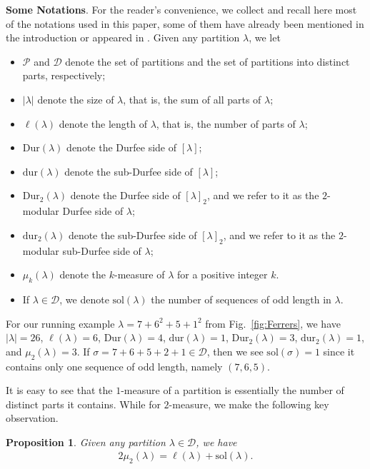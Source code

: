 \documentclass[11pt,reqno]{amsart}
\numberwithin{equation}{section}
\theoremstyle{plain}
\newtheorem{proposition}[theorem]{Proposition}
\theoremstyle{definition}
\theoremstyle{named}
\newcommand{\abs}[1]{\left|#1\right|}
\def\cD{\mathcal{D}}
\def\cP{\mathcal{P}}
\def\la{\lambda}
\def\sol{\mathrm{sol}}
\def\Dur{\mathrm{Dur}}
\def\dur{\mathrm{dur}}
\begin{document}
\noindent \textbf{Some Notations}. For the reader's convenience, we collect and recall here most of the notations used in this paper, some of them have already been mentioned in the introduction or appeared in \cite{FL24}. Given any partition $\la$, we let
\begin{itemize}
\item $\cP$ and $\cD$ denote the set of partitions and the set of partitions into distinct parts, respectively;

\item $|\la|$ denote the size of $\la$, that is, the sum of all parts of $\la$;

\item $\ell(\la)$ denote the length of $\la$, that is, the number of parts of $\la$;

\item $\Dur(\la)$ denote the Durfee side of $[\la]$;

\item $\dur(\la)$ denote the sub-Durfee side of $[\la]$;

\item $\Dur_2(\la)$ denote the Durfee side of $[\la]_2$, and we refer to it as the $2$-modular Durfee side of $\la$;

\item $\dur_2(\la)$ denote the sub-Durfee side of $[\la]_2$, and we refer to it as the $2$-modular sub-Durfee side of $\la$;

\item $\mu_{k}(\la)$ denote the $k$-measure of $\la$ for a positive integer $k$.

\item If $\la\in \cD$, we denote $\sol(\la)$ the number of sequences of odd length in $\la$.
\end{itemize}

For our running example $\la=7+6^2+5+1^2$ from Fig.~\ref{fig:Ferrers}, we have $\abs{\la}=26$, $\ell(\la)=6$, $\Dur(\la)=4$, $\dur(\la)=1$, $\Dur_2(\la)=3$, $\dur_2(\la)=1$, and $\mu_2(\la)=3$. If $\sigma=7+6+5+2+1\in\cD$, then we see $\sol(\sigma)=1$ since it contains only one sequence of odd length, namely $(7,6,5)$.

It is easy to see that the $1$-measure of a partition is essentially the number of distinct parts it contains. While for $2$-measure, we make the following key observation.

\begin{proposition}
Given any partition $\la\in \cD$, we have
\begin{align}\label{id:2measure-sol}
2\mu_{2}(\la)=\ell(\la)+\sol(\la).
\end{align}
\end{proposition}
\end{document}

